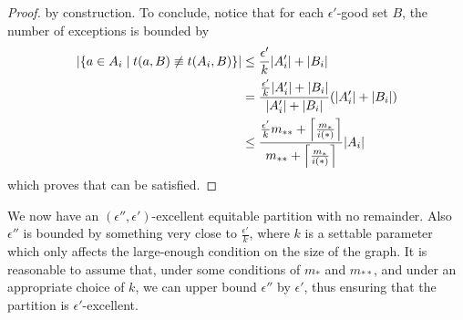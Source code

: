 \begin{lemma}[Claim 5.14.2]
\begin{proof}
                 by construction.
                To conclude, notice that for each $\epsilon'$-good set $B$, the number of exceptions is bounded by
                \begin{align*}
                    | \{ a \in A_i \mid t(a, B) \not\equiv t(A_i, B) \} |
                        & \leq \frac{\epsilon'}{k} | A_i' | + | B_i | \\
                        & = \frac{\frac{\epsilon'}{k} | A_i' | + | B_i |}{| A_i' | + | B_i |}
                            ( | A_i' | + | B_i | ) \\
                        & \leq \frac{\frac{\epsilon'}{k} m_{**} + \left\lceil \frac{m_*}{i(*)} \right\rceil}{m_{**} + \left\lceil \frac{m_*}{i(*)} \right\rceil}
                            | A_i |
                \end{align*}
                which proves that  can be satisfied.
            \end{proof}
        \end{lemma}

        We now have an $(\epsilon'', \epsilon')$-excellent equitable partition with no remainder.
        Also $\epsilon''$ is bounded by something very close to $\frac{\epsilon'}{k}$, where $k$ is a settable parameter
        which only affects the large-enough condition on the size of the graph.
        It is reasonable to assume that, under some conditions of $m_*$ and $m_{**}$, and under an appropriate choice of $k$,
        we can upper bound $\epsilon''$ by $\epsilon'$, thus ensuring that the partition is $\epsilon'$-excellent.

